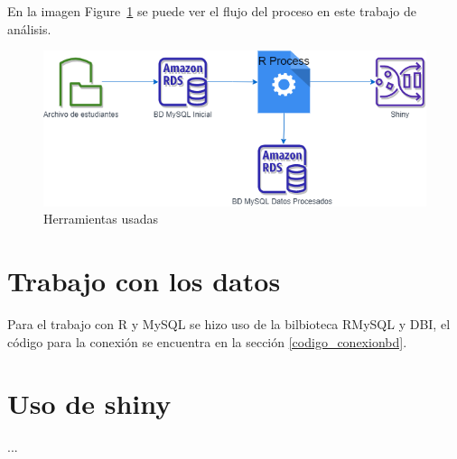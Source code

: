 En la imagen Figure~\ref{fig:proceso} se puede ver el flujo del proceso en este trabajo de análisis.
\begin{figure}[th]
\centering
\includegraphics[width=1.1\textwidth]{Figures/proceso-archi}
\decoRule
\caption[Proceso de exploración de los datos]{Herramientas usadas}
\label{fig:proceso}
\end{figure}

\section{Trabajo con los datos}

Para el trabajo con R y MySQL se hizo uso de la bilbioteca RMySQL y DBI, el código para la conexión se encuentra en la sección \ref{codigo_conexionbd}.

\section{Uso de shiny}

...